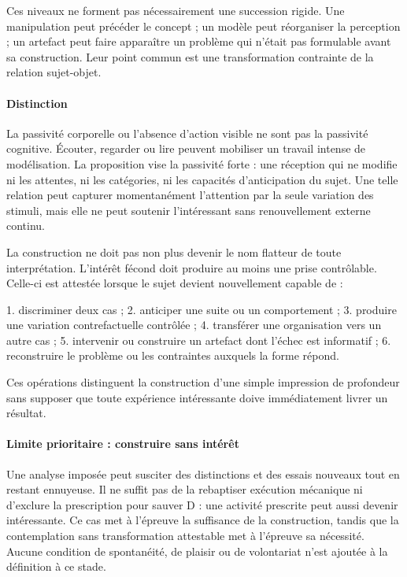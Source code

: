 \documentclass[10pt,a4paper]{article}
\begin{document}
Ces niveaux ne forment pas nécessairement une succession rigide. Une manipulation peut précéder le concept ; un modèle peut réorganiser la perception ; un artefact peut faire apparaître un problème qui n'était pas formulable avant sa construction. Leur point commun est une transformation contrainte de la relation sujet-objet.

\paragraph{Distinction}
La passivité corporelle ou l'absence d'action visible ne sont pas la passivité cognitive. Écouter, regarder ou lire peuvent mobiliser un travail intense de modélisation. La proposition vise la passivité forte : une réception qui ne modifie ni les attentes, ni les catégories, ni les capacités d'anticipation du sujet. Une telle relation peut capturer momentanément l'attention par la seule variation des stimuli, mais elle ne peut soutenir l'intéressant sans renouvellement externe continu.

La construction ne doit pas non plus devenir le nom flatteur de toute interprétation. L'intérêt fécond doit produire au moins une prise contrôlable. Celle-ci est attestée lorsque le sujet devient nouvellement capable de :

1. discriminer deux cas ; 2. anticiper une suite ou un comportement ; 3. produire une variation contrefactuelle contrôlée ; 4. transférer une organisation vers un autre cas ; 5. intervenir ou construire un artefact dont l'échec est informatif ; 6. reconstruire le problème ou les contraintes auxquels la forme répond.

Ces opérations distinguent la construction d'une simple impression de profondeur sans supposer que toute expérience intéressante doive immédiatement livrer un résultat.

\paragraph{Limite prioritaire : construire sans intérêt}
Une analyse imposée peut susciter des distinctions et des essais nouveaux tout en restant ennuyeuse. Il ne suffit pas de la rebaptiser exécution mécanique ni d'exclure la prescription pour sauver D : une activité prescrite peut aussi devenir intéressante. Ce cas met à l'épreuve la suffisance de la construction, tandis que la contemplation sans transformation attestable met à l'épreuve sa nécessité. Aucune condition de spontanéité, de plaisir ou de volontariat n'est ajoutée à la définition à ce stade.
\end{document}
